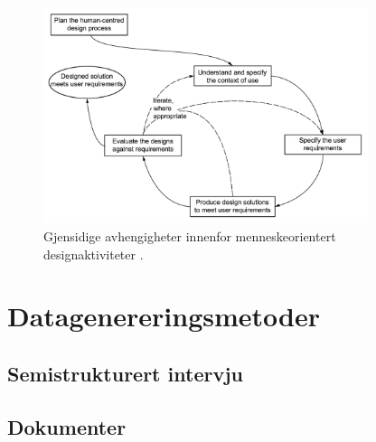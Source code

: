 \begin{figure}
\centering
\includegraphics[width=0.85\textwidth]{fig/iso9241-210}
\caption{Gjensidige avhengigheter innenfor menneskeorientert designaktiviteter \citep{dis20099241}.}
\label{fig:iso9241-210}
\end{figure}

\section{Datagenereringsmetoder}

\subsection{Semistrukturert intervju}

\subsection{Dokumenter}